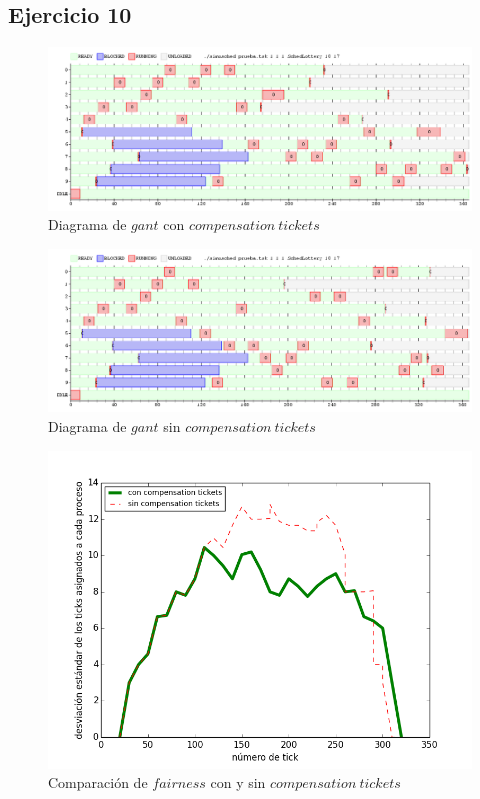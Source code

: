 \documentclass[11pt, a4paper, twoside]{article}
\begin{document}
\clearpage
\subsection{Ejercicio 10}

\begin{figure}[H]
\centering
\includegraphics[scale=0.5]{../experimentacion/ej10-compensation/gant-sin.png}
\caption{Diagrama de $gant$ con $compensation\ tickets$}
\end{figure}

\begin{figure}[H]
\centering
\includegraphics[scale=0.5]{../experimentacion/ej10-compensation/gant-con.png}
\caption{Diagrama de $gant$ sin $compensation\ tickets$}
\end{figure}

\begin{figure}[H]
\centering
\includegraphics[scale=0.66]{../experimentacion/ej10-compensation/plot-comparativa.png}
\caption{Comparación de $fairness$ con y sin $compensation\ tickets$}
\end{figure}
\end{document}
